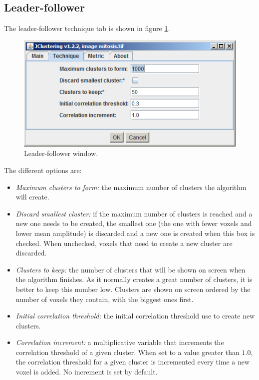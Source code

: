 \documentclass[11pt]{article} %
\begin{document}
\subsection{Leader-follower}

The leader-follower technique tab is shown in figure \ref{fig:leader-follower_window}.

\begin{figure}[h!]
  \centering
    \includegraphics[width=\textwidth]{figures/leader-follower_window}
  \caption{Leader-follower window.}
  \label{fig:leader-follower_window}
\end{figure}

The different options are:

\begin{itemize}
\item {\em Maximum clusters to form:} the maximum number of clusters the algorithm will create.
\item {\em Discard smallest cluster:} if the maximum number of clusters is reached and a new one needs to be created,
the smallest one (the one with fewer voxels and lower mean amplitude) is discarded and a new one is created when this
box is checked. When unchecked, voxels that need to create a new cluster are discarded.
\item {\em Clusters to keep:} the number of clusters that will be shown on screen when the algorithm finishes. As it normally
creates a great number of clusters, it is better to keep this number low. Clusters are shown on screen ordered by the number
of voxels they contain, with the biggest ones first.
\item {\em Initial correlation threshold:} the initial correlation threshold use to create new clusters.
\item {\em Correlation increment:} a multiplicative variable that increments the correlation threshold of a given cluster. When
set to a value greater than $1.0$, the correlation threshold for a given cluster is incremented every time a new voxel is added.
No increment is set by default.
 
\end{itemize}
\end{document}
